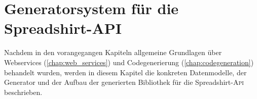 \chapter{Generatorsystem für die Spreadshirt-API}
\label{chap:generator-system_for_spreadshirt-api}


Nachdem in den vorangegangen Kapiteln allgemeine Grundlagen über Webservices (\cref{chap:web_services}) und Codegenerierung (\cref{chap:codegeneration}) behandelt wurden, werden in diesem Kapitel die konkreten Datenmodelle, der Generator und der Aufbau der generierten Bibliothek für die Spreadshirt-\textsc{Api} beschrieben.







%
